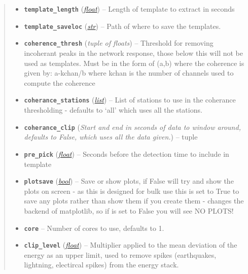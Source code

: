 \documentclass[a4paper,10pt,english]{sphinxmanual}
\begin{document}
\begin{fulllineitems}
\begin{quote}
\begin{description}
\begin{itemize}
\item {} 
\textbf{\texttt{template\_length}} (\href{https://docs.python.org/library/functions.html\#float}{\emph{float}}) -- Length of template to extract in seconds

\item {} 
\textbf{\texttt{template\_saveloc}} (\href{https://docs.python.org/library/functions.html\#str}{\emph{str}}) -- Path of where to save the templates.

\item {} 
\textbf{\texttt{coherence\_thresh}} (\emph{tuple of floats}) -- Threshold for removing incoherant peaks in the            network response, those below this will not be used as templates.            Must be in the form of (a,b) where the coherence is given by:            a-kchan/b where kchan is the number of channels used to compute            the coherence

\item {} 
\textbf{\texttt{coherance\_stations}} (\href{https://docs.python.org/library/functions.html\#list}{\emph{list}}) -- List of stations to use in the coherance            thresholding - defaults to `all' which uses all the stations.

\item {} 
\textbf{\texttt{coherance\_clip}} (\emph{Start and end in seconds of data to window around,            defaults to False, which uses all the data given.}) -- tuple

\item {} 
\textbf{\texttt{pre\_pick}} (\href{https://docs.python.org/library/functions.html\#float}{\emph{float}}) -- Seconds before the detection time to include in template

\item {} 
\textbf{\texttt{plotsave}} (\href{https://docs.python.org/library/functions.html\#bool}{\emph{bool}}) -- Save or show plots, if False will try and show the plots            on screen - as this is designed for bulk use this is set to            True to save any plots rather than show them if you create            them - changes the backend of matplotlib, so if is set to            False you will see NO PLOTS!

\item {} 
\textbf{\texttt{core}} -- Number of cores to use, defaults to 1.

\item {} 
\textbf{\texttt{clip\_level}} (\href{https://docs.python.org/library/functions.html\#float}{\emph{float}}) -- Multiplier applied to the mean deviation of the energy                    as an upper limit, used to remove spikes (earthquakes,                     lightning, electircal spikes) from the energy stack.


\end{itemize}
\end{description}
\end{quote}
\end{fulllineitems}
\end{document}
